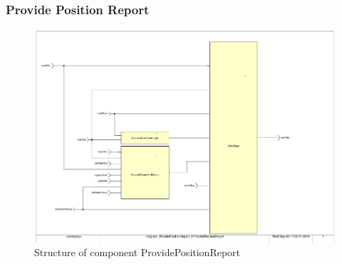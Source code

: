 \subsubsection{Provide Position Report}\label{sss:provposrep}

\begin{figure}[ht]
\centering
\includegraphics[scale=0.6]{../images/ProvidePositionReport.pdf}
\caption{Structure of component ProvidePositionReport}\label{fig:provideposrep}
\end{figure}

